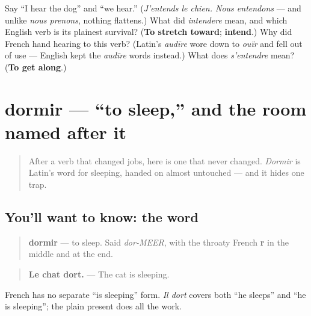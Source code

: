 \begin{tcolorbox}[breakable,colback=teal!4,colframe=teal!35!black,title={Before you move on}]
Say \textquotedblleft{}I hear the dog\textquotedblright{} and \textquotedblleft{}we hear.\textquotedblright{} (\emph{J'entends le chien. Nous entendons} — and unlike \emph{nous prenons}, nothing flattens.) What did \emph{intendere} mean, and which English verb is its plainest survival? (\textbf{To stretch toward}; \textbf{intend}.) Why did French hand hearing to this verb? (Latin's \emph{audīre} wore down to \emph{ouïr} and fell out of use — English kept the \emph{audīre} words instead.) What does \emph{s'entendre} mean? (\textbf{To get along}.)
\end{tcolorbox}
\section[dormir]{dormir — \textquotedblleft{}to sleep,\textquotedblright{} and the room named after it}

\label{lesson:FR-C26-dormir}



\begin{quote}
After a verb that changed jobs, here is one that never changed. \emph{Dormir} is Latin's word for sleeping, handed on almost untouched — and it hides one trap.
\end{quote}

\subsection*{You'll want to know: the word}
\begin{quote}
\textbf{dormir} — to sleep. Said \emph{dor-MEER}, with the throaty French \textbf{r} in the middle and at the end.
\end{quote}

\begin{quote}
\textbf{Le chat dort.} — The cat is sleeping.
\end{quote}

French has no separate \textquotedblleft{}is sleeping\textquotedblright{} form. \emph{Il dort} covers both \textquotedblleft{}he sleeps\textquotedblright{} and \textquotedblleft{}he is sleeping\textquotedblright{}; the plain present does all the work.

